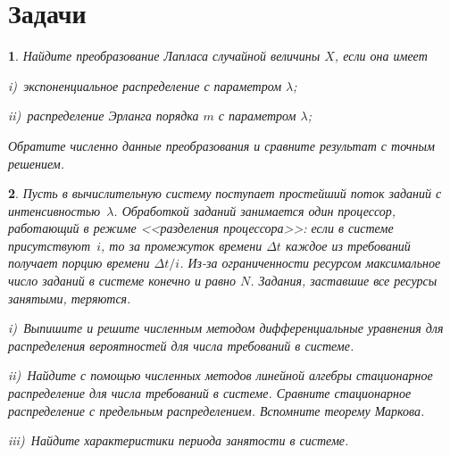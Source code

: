 \documentclass[10pt,oneside,final]{book}
\newtheorem{zadacha}{}[chapter]
\begin{document}
\section{Задачи}
\begin{zadacha}
  Найдите преобразование Лапласа случайной величины $X$, если она имеет\par
  \textit{i})~экспоненциальное распределение с параметром $\lambda$;\par
  \textit{ii)}~распределение Эрланга порядка $m$ с параметром $\lambda$;\par
  Обратите численно данные преобразования и сравните результат с точным решением.
\end{zadacha}

\begin{zadacha}
  \label{z:MM1-PS} Пусть в вычислительную систему поступает простейший
  поток заданий с интенсивностью~$\lambda$. Обработкой заданий занимается один
  процессор, работающий в режиме <<разделения процессора>>: если в системе
  присутствуют~$i$, то за промежуток времени $\Delta t$ каждое из требований
  получает порцию времени $\Delta t/i$. Из-за ограниченности ресурсом
  максимальное число заданий в системе конечно и равно $N$. Задания,
  заставшие все ресурсы занятыми, теряются. \par
  \textit{i})~Выпишите и решите численным методом дифференциальные уравнения для
  распределения вероятностей для числа требований в системе. \par
  \textit{ii})~Найдите с помощью численных методов линейной алгебры стационарное
  распределение для числа требований в системе. Сравните стационарное
  распределение с предельным распределением. Вспомните теорему Маркова.\par
  \textit{iii})~Найдите характеристики периода занятости в системе.
\end{zadacha}

\end{document}
